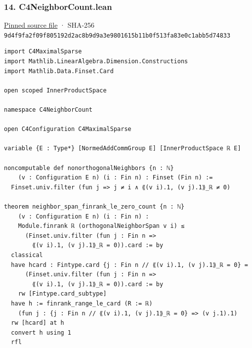 \documentclass[11pt,a4paper]{article}
\begin{document}
\subsubsection{14. C4NeighborCount.lean}\label{c4neighborcount.lean}

\href{https://github.com/mpelteshki/climbing-to-the-frontier/blob/29fbb70da18564048f62492e43870f2f96a65463/cagent/p1/C4NeighborCount.lean}{Pinned source file} · SHA-256 \texttt{9d4f9fa2\allowbreak{}f09f8051\allowbreak{}92d2ac8b\allowbreak{}9d9a3e98\allowbreak{}01615b11\allowbreak{}b0f513fa\allowbreak{}83e0c1ab\allowbreak{}b5d74833}

\begin{Verbatim}[breaklines,breakanywhere,fontsize=\footnotesize]
import C4MaximalSparse
import Mathlib.LinearAlgebra.Dimension.Constructions
import Mathlib.Data.Finset.Card

open scoped InnerProductSpace

namespace C4NeighborCount

open C4Configuration C4MaximalSparse

variable {E : Type*} [NormedAddCommGroup E] [InnerProductSpace ℝ E]

noncomputable def nonorthogonalNeighbors {n : ℕ}
    (v : Configuration E n) (i : Fin n) : Finset (Fin n) :=
  Finset.univ.filter (fun j => j ≠ i ∧ ⟪(v i).1, (v j).1⟫_ℝ ≠ 0)

theorem neighbor_span_finrank_le_zero_count {n : ℕ}
    (v : Configuration E n) (i : Fin n) :
    Module.finrank ℝ (orthogonalNeighborSpan v i) ≤
      (Finset.univ.filter (fun j : Fin n =>
        ⟪(v i).1, (v j).1⟫_ℝ = 0)).card := by
  classical
  have hcard : Fintype.card {j : Fin n // ⟪(v i).1, (v j).1⟫_ℝ = 0} =
      (Finset.univ.filter (fun j : Fin n =>
        ⟪(v i).1, (v j).1⟫_ℝ = 0)).card := by
    rw [Fintype.card_subtype]
  have h := finrank_range_le_card (R := ℝ)
    (fun j : {j : Fin n // ⟪(v i).1, (v j).1⟫_ℝ = 0} => (v j.1).1)
  rw [hcard] at h
  convert h using 1
  rfl


\end{Verbatim}
\end{document}
